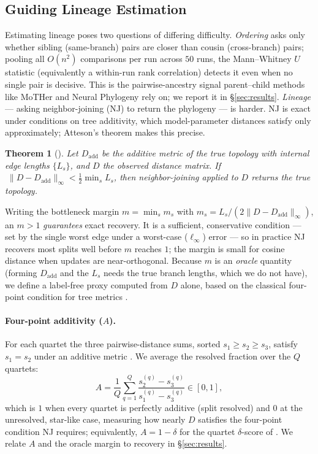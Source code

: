 \documentclass{article}
\newtheorem{theorem}{Theorem}
\theoremstyle{definition}
\theoremstyle{plain}
\begin{document}
\subsection{Guiding Lineage Estimation}
\label{sec:framework:theory}

Estimating lineage poses two questions of differing difficulty. \emph{Ordering} asks only whether
sibling (same-branch) pairs are closer than cousin (cross-branch) pairs; pooling all $O(n^2)$
comparisons per run across $50$ runs, the Mann--Whitney $U$ statistic (equivalently a within-run rank
correlation) detects it even when no single pair is decisive. This is the pairwise-ancestry signal
parent--child methods like MoTHer \citep{horwitz2025mother} and Neural Phylogeny
\citep{yu2025neural} rely on; we report it in \S\ref{sec:results}. \emph{Lineage} ---
asking neighbor-joining (NJ) to return the phylogeny --- is harder. NJ is exact under
conditions on tree additivity, which model-parameter distances satisfy only approximately; Atteson's
theorem makes this precise.
\begin{theorem}[\citealp{atteson1999performance}]\label{thm:atteson}
Let $D_{\mathrm{add}}$ be the additive metric of the true topology with internal edge lengths
$\{L_s\}$, and $D$ the observed distance matrix. If
$\;\lVert D-D_{\mathrm{add}}\rVert_\infty < \tfrac12\min_s L_s$, then neighbor-joining applied to $D$
returns the true topology.
\end{theorem}
Writing the bottleneck margin $m=\min_s m_s$ with $m_s=L_s/(2\lVert D-D_{\mathrm{add}}\rVert_\infty)$, an
$m>1$ \emph{guarantees} exact recovery. It is a sufficient, conservative condition --- set by the single
worst edge under a worst-case ($\ell_\infty$) error --- so in practice NJ recovers most splits well
before $m$ reaches $1$; the margin is small for cosine distance when updates are near-orthogonal. Because
$m$ is an \emph{oracle} quantity (forming $D_{\mathrm{add}}$ and the $L_s$ needs the true branch lengths,
which we do not have), we define a label-free proxy computed from $D$ alone, based on the classical
four-point condition for tree metrics \citep{buneman1971recovery}.

\paragraph{Four-point additivity ($A$).} For each quartet the three pairwise-distance sums, sorted
$s_1\ge s_2\ge s_3$, satisfy $s_1=s_2$ under an additive metric \citep{buneman1971recovery}. We average
the resolved fraction over the $Q$ quartets:
\[
  A=\frac{1}{Q}\sum_{q=1}^{Q}\frac{s_2^{(q)}-s_3^{(q)}}{s_1^{(q)}-s_3^{(q)}}\in[0,1] ,
\]
which is $1$ when every quartet is perfectly additive (split resolved) and $0$ at the unresolved,
star-like case, measuring how nearly $D$ satisfies the four-point condition NJ requires; equivalently,
$A=1-\delta$ for the quartet $\delta$-score of \citet{holland2002delta}. We relate $A$ and the oracle
margin to recovery in \S\ref{sec:results}.
\end{document}
